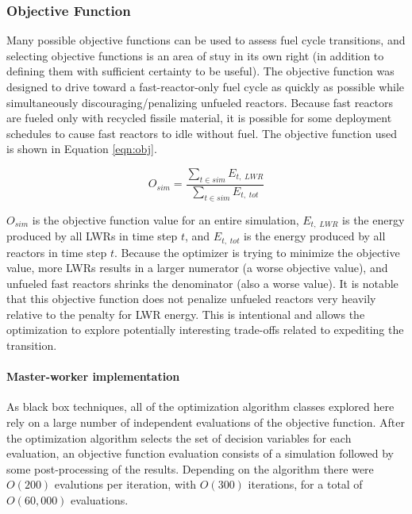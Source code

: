 \subsubsection{Objective Function}

Many possible objective functions can be used to assess fuel cycle
transitions, and selecting objective functions is an area of stuy in its own
right (in addition to defining them with sufficient certainty to be useful).
The objective function was designed to drive toward a fast-reactor-only fuel
cycle as quickly as possible while simultaneously discouraging/penalizing
unfueled reactors.  Because fast reactors are fueled only with recycled
fissile material, it is possible for some deployment schedules to cause fast
reactors to idle without fuel.  The objective function used is shown in
Equation \ref{eqn:obj}.

\begin{equation}
    \label{eqn:obj}
    O_{sim} = \frac{\sum\limits_{t \in sim} E_{t,\;LWR}}{\sum\limits_{t \in sim} E_{t,\;tot}}
\end{equation}

$O_{sim}$ is the objective function value for an entire simulation,
$E_{t,\;LWR}$ is the energy produced by all \gls{LWR}s in time step $t$, and
$E_{t,\;tot}$ is the energy produced by all reactors in time step $t$.
Because the optimizer is trying to minimize the objective value, more
\gls{LWR}s results in a larger numerator (a worse objective value), and
unfueled fast reactors shrinks the denominator (also a worse value).  It is
notable that this objective function does not penalize unfueled reactors very
heavily relative to the penalty for \gls{LWR} energy.  This is intentional and
allows the optimization to explore potentially interesting trade-offs related
to expediting the transition.


\paragraph{Master-worker implementation}

As black box techniques, all of the optimization algorithm classes explored
here rely on a large number of independent evaluations of the objective
function.  After the optimization algorithm selects the set of decision
variables for each evaluation, an objective function evaluation consists of a
\Cyclus{} simulation followed by some post-processing of the results.
Depending on the algorithm there were $O(200)$ evalutions per iteration, with
$O(300)$ iterations, for a total of $O(60,000)$ evaluations.  

